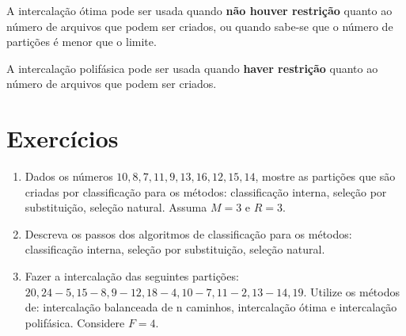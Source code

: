 A intercalação ótima pode ser usada quando {\bf não houver restrição} quanto ao
número de arquivos que podem ser criados, ou quando sabe-se que o número de
partições é menor que o limite.

A intercalação polifásica pode ser usada quando {\bf haver restrição} quanto ao
número de arquivos que podem ser criados.

\section{Exercícios}

\begin{enumerate}
\item Dados os números $10, 8, 7, 11, 9, 13, 16, 12, 15, 14$, mostre as partições
que são criadas por classificação para os métodos: classificação interna, seleção
por substituição, seleção natural.
Assuma $M = 3$ e $R = 3$.

\item Descreva os passos dos algoritmos de classificação para os métodos:
classificação interna, seleção por substituição, seleção natural.

\item Fazer a intercalação das seguintes partições:
$20, 24 - 5, 15 - 8, 9 - 12, 18 - 4, 10 - 7, 11 - 2, 13 - 14, 19$.
Utilize os métodos de: intercalação balanceada de n caminhos, intercalação ótima e intercalação
polifásica.
Considere $F = 4$.

\end{enumerate}
